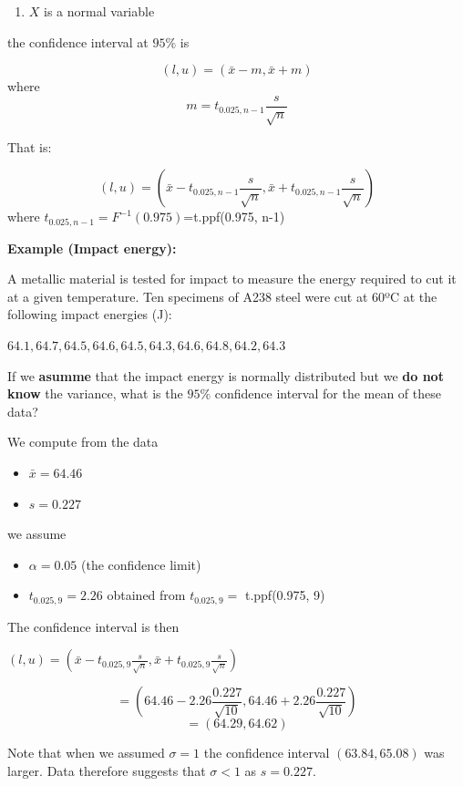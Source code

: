 \documentclass[
]{book}
\providecommand{\tightlist}{%
  \setlength{\itemsep}{0pt}\setlength{\parskip}{0pt}}
\begin{document}
\begin{enumerate}
\def\labelenumi{\arabic{enumi}.}
\tightlist
\item
  \(X\) is a normal variable
\end{enumerate}

the confidence interval at \(95\%\) is

\[(l,u)=(\bar{x} - m, \bar{x} + m)\]
where \[m=t_{0.025, n-1} \frac{s}{\sqrt{n}}\]

That is:

\[(l,u)=(\bar{x} - t_{0.025, n-1} \frac{s}{\sqrt{n}}, \bar{x} + t_{0.025, n-1} \frac{s}{\sqrt{n}})\]
where \(t_{0.025, n-1}=F^{-1}(0.975)\)=t.ppf(0.975, n-1)

\textbf{Example (Impact energy):}

A metallic material is tested for impact to measure the energy required to cut it at a given temperature. Ten specimens of A238 steel were cut at 60ºC at the following impact energies (J):

\(64.1, 64.7, 64.5, 64.6, 64.5, 64.3, 64.6, 64.8, 64.2, 64.3\)

If we \textbf{asumme} that the impact energy is normally distributed but we \textbf{do not know} the variance, what is the \(95\%\) confidence interval for the mean of these data?

We compute from the data

\begin{itemize}
\tightlist
\item
  \(\bar{x}=64.46\)
\item
  \(s=0.227\)
\end{itemize}

we assume

\begin{itemize}
\tightlist
\item
  \(\alpha=0.05\) (the confidence limit)
\item
  \(t_{0.025,9}=2.26\) obtained from \(t_{0.025,9}=\) t.ppf(0.975, 9)
\end{itemize}

The confidence interval is then

\((l,u)=(\bar{x}- t_{0.025,9}\frac{s}{\sqrt{n}},\bar{x}+t_{0.025,9} \frac{s}{\sqrt{n}})\)

\[=(64.46-2.26 \frac{0.227}{\sqrt{10}},64.46+2.26 \frac{0.227}{\sqrt{10}})\] \[=(64.29,64.62)\]

Note that when we assumed \(\sigma=1\) the confidence interval \((63.84,65.08)\) was larger. Data therefore suggests that \(\sigma<1\) as \(s=0.227\).
\end{document}
